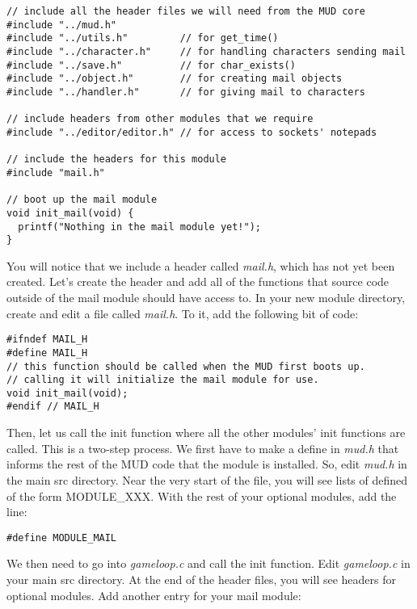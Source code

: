 \documentclass[12pt]{article}
\begin{document}
{\bf \begin{verbatim}
// include all the header files we will need from the MUD core
#include "../mud.h"
#include "../utils.h"         // for get_time()
#include "../character.h"     // for handling characters sending mail
#include "../save.h"          // for char_exists()
#include "../object.h"        // for creating mail objects
#include "../handler.h"       // for giving mail to characters

// include headers from other modules that we require
#include "../editor/editor.h" // for access to sockets' notepads

// include the headers for this module
#include "mail.h"

// boot up the mail module
void init_mail(void) {
  printf("Nothing in the mail module yet!");
}
\end{verbatim}}

You will notice that we include a header called {\it mail.h}, which has not yet been created. Let's create the header and add all of the functions that source code outside of the mail module should have access to. In your new module directory, create and edit a file called {\it mail.h}. To it, add the following bit of code:

{\bf \begin{verbatim}
#ifndef MAIL_H
#define MAIL_H
// this function should be called when the MUD first boots up.
// calling it will initialize the mail module for use.
void init_mail(void);
#endif // MAIL_H
\end{verbatim}}

Then, let us call the init function where all the other modules' init functions are called. This is a two-step process. We first have to make a define in {\it mud.h} that informs the rest of the MUD code that the module is installed. So, edit {\it mud.h} in the main src directory. Near the very start of the file, you will see lists of defined of the form MODULE\_XXX. With the rest of your optional modules, add the line:

{\bf \begin{verbatim}
#define MODULE_MAIL
\end{verbatim}}

We then need to go into {\it gameloop.c} and call the init function. Edit {\it gameloop.c} in your main src directory. At the end of the header files, you will see headers for optional modules. Add another entry for your mail module:
\end{document}
